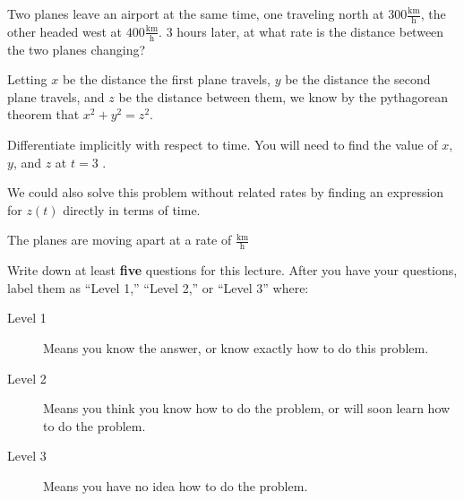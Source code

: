 \documentclass{ximera}
\begin{document}
\begin{question}
	Two planes leave an airport at the same time, one traveling north at $300 \frac{\textrm{km}}{\textrm{h}} $, the other headed west at $400 \frac{\textrm{km}}{\textrm{h}}$.  $3$ hours later, at what rate is the distance between the two planes changing? 
	\begin{solution}
		\begin{hint}
			Letting $x$ be the distance the first plane travels, $y$ be the distance the second plane travels, and $z$ be the distance between them, we know by the pythagorean theorem that $x^2+y^2=z^2$.
		\end{hint}
		\begin{hint}
			Differentiate implicitly with respect to time.  You will need to find the value of $x$, $y$, and $z$ at $t=3$ .
		\end{hint}
		\begin{hint}
			We could also solve this problem without related rates by finding an expression for $z(t)$ directly in terms of time.
		\end{hint}
		The planes are moving apart at a rate of  $\frac{\textrm{km}}{\textrm{h}}$
	\end{solution}
\end{question}


Write down at least \textbf{five} questions for this lecture. After
you have your questions, label them as ``Level 1,'' ``Level 2,'' or ``Level 3'' where:
\begin{description}
\item[Level 1] Means you know the answer, or know exactly how to do this problem.
\item[Level 2] Means you think you know how to do the problem, or will soon learn how to do the problem.
\item[Level 3] Means you have no idea how to do the problem. 
\end{description}
\begin{question}
  \begin{freeResponse}
  \end{freeResponse}
\end{question}
\end{document}
